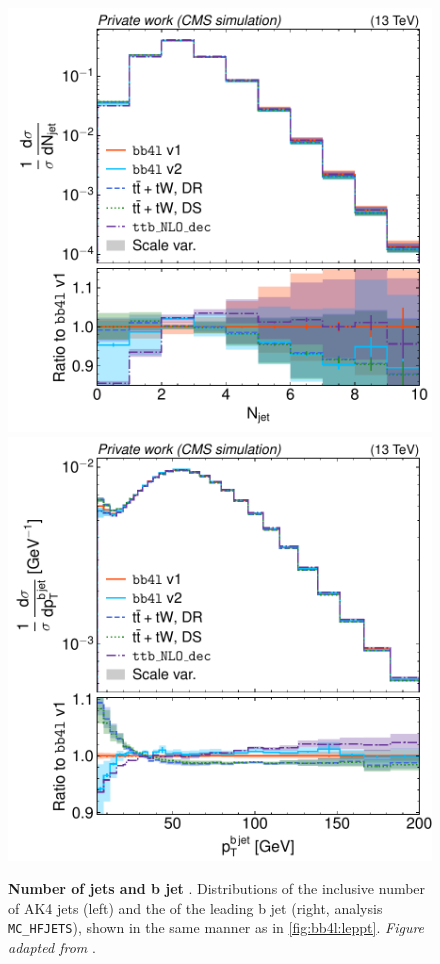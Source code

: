 \begin{figure}[tp]
    \centering
    \includegraphics[width=0.49 \textwidth]{figures/bb4l/generators/MC_TTBAR_DILEP_SPINDENSITY_njet.pdf}
    \hfill
    \includegraphics[width=0.49 \textwidth]{figures/bb4l/generators/MC_HFJETS_ptBJetLead.pdf}
    \caption{\textbf{Number of jets and b jet \pt}. Distributions of the inclusive number of AK4 jets (left) and the \pt of the leading b jet (right, \rivet analysis \texttt{MC\_HFJETS}), shown in the same manner as in \cref{fig:bb4l:leppt}. \textit{Figure adapted from }.}
    \label{fig:bb4l:jets1}
\end{figure}

